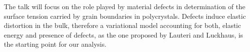 \mypage
{}
\begin{myabstract}
The talk will focus on the role played by material defects in determination of the surface tension carried by grain boundaries in polycrystals. Defects induce elastic distortion in the bulk, therefore a variational model accounting for both, elastic energy and presence of defects, as the one proposed by Lauteri and Luckhaus, is the starting point for our analysis.
\end{myabstract}
